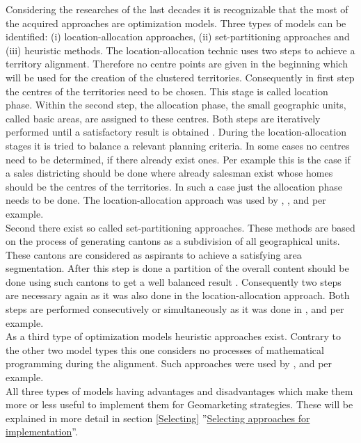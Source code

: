 Considering the researches of the last decades it is recognizable that the most of the acquired approaches are optimization models. Three types of models can be identified: (i) location-allocation approaches, (ii) set-partitioning approaches and (iii) heuristic methods. The location-allocation technic uses two steps to achieve a territory alignment. Therefore no centre points are given in the beginning which will be used for the creation of the clustered territories. Consequently in first step the centres of the territories need to be chosen. This stage is called location phase. Within the second step, the allocation phase, the small geographic units, called basic areas, are assigned to these centres. Both steps are iteratively performed until a satisfactory result is obtained \cite{kalcsics}. During the location-allocation stages it is tried to balance a relevant planning criteria. In some cases no centres need to be determined, if there already exist ones. Per example this is the case if a sales districting should be done where already salesman exist whose homes should be the centres of the territories. In such a case just the allocation phase needs to be done. The location-allocation approach was used by \citeauthor{hessstuart} \cite{hessstuart}, \citeauthor{zoltner} \cite{zoltner}, \citeauthor{george} \cite{george} and \citeauthor{schroeder} \cite{schroeder} per example.\\
Second there exist so called set-partitioning approaches. These methods are based on the process of generating cantons as a subdivision of all geographical units. These cantons are considered as aspirants to achieve a satisfying area segmentation. After this step is done a partition of the overall content should be done using such cantons to get a well balanced result \cite{schroeder}. Consequently two steps are necessary again as it was also done in the location-allocation approach. Both steps are performed consecutively or simultaneously as it was done in \citeauthor{garfinkel} \cite{garfinkel}, \citeauthor{nygreen} \cite{nygreen} and \citeauthor{mehrotra} \cite{mehrotra} per example. \\
As a third type of optimization models heuristic approaches exist. Contrary to the other two model types this one considers no processes of mathematical programming during the alignment. Such approaches were used by \citeauthor{mehrotra} \cite{mehrotra}, \citeauthor{deckro} \cite{deckro} and \citeauthor{bodin} \cite{bodin} per example.\\
All three types of models having advantages and disadvantages which make them more or less useful to implement them for Geomarketing strategies. These will be explained in more detail in section \ref{Selecting} ''\hyperref[Selecting]{Selecting approaches for implementation}''.


